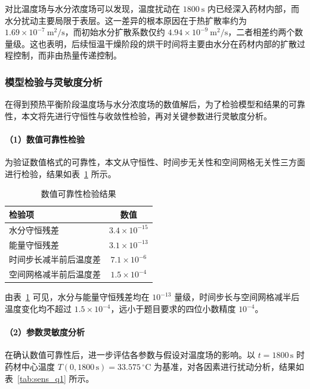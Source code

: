 \documentclass[12pt,a4paper]{article}
\begin{document}
对比温度场与水分浓度场可以发现，温度扰动在 \(1800\ \mathrm{s}\) 内已经深入药材内部，而水分扰动主要局限于表层。这一差异的根本原因在于热扩散率约为 \(1.69\times10^{-7}\ \mathrm{m^2/s}\)，而初始水分扩散系数仅约 \(4.94\times10^{-9}\ \mathrm{m^2/s}\)，二者相差约两个数量级。这也表明，后续恒温干燥阶段的烘干时间将主要由水分在药材内部的扩散过程控制，而非由热量传递控制。



\subsubsection{模型检验与灵敏度分析}

在得到预热平衡阶段温度场与水分浓度场的数值解后，为了检验模型和结果的可靠性，本文将先进行守恒性与收敛性检验，再对关键参数进行灵敏度分析。

\paragraph{（1）数值可靠性检验}

为验证数值格式的可靠性，本文从守恒性、时间步无关性和空间网格无关性三方面进行检验，结果如表~\ref{tab:verification} 所示。

\begin{table}[htbp]
\centering
\caption{数值可靠性检验结果}
\label{tab:verification}
\renewcommand{\arraystretch}{1.15}
\begin{tabular}{lc}
\toprule
检验项 & 数值 \\
\midrule
水分守恒残差 & \(3.4\times10^{-15}\) \\
能量守恒残差 & \(3.1\times10^{-13}\) \\
时间步长减半前后温度差 & \(7.1\times10^{-6}\) \\
空间网格减半前后温度差 & \(1.5\times10^{-4}\) \\
\bottomrule
\end{tabular}
\end{table}

由表~\ref{tab:verification} 可见，水分与能量守恒残差均在 \(10^{-13}\) 量级，时间步长与空间网格减半后温度变化均不超过 \(1.5\times10^{-4}\)，远小于题目要求的四位小数精度 \(10^{-4}\)。

\paragraph{（2）参数灵敏度分析}

在确认数值可靠性后，进一步评估各参数与假设对温度场的影响。以 \(t=1800\,\mathrm{s}\) 时药材中心温度 \(T(0,1800\,\mathrm{s})=33.575\,^\circ\mathrm{C}\) 为基准，对各因素进行扰动分析，结果如表~\ref{tab:sens_q1} 所示。
\end{document}
